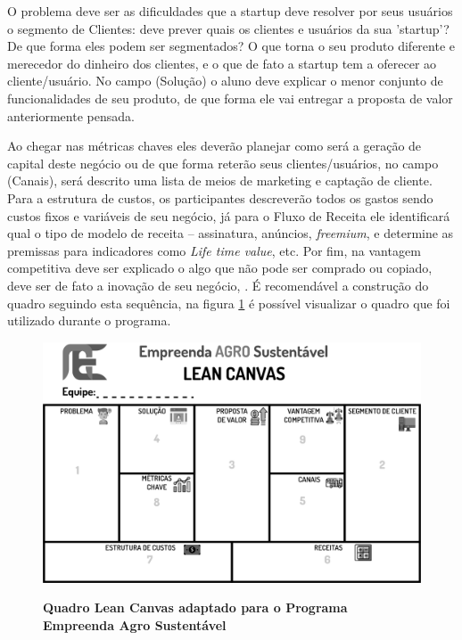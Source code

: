 O problema deve ser as dificuldades que a startup deve resolver por seus usuários o segmento de Clientes: deve prever quais os clientes e usuários da sua ’startup’? De que forma eles podem ser segmentados? O que torna o seu produto diferente e merecedor do dinheiro dos clientes, e o que de fato a startup tem a oferecer ao cliente/usuário. No campo (Solução) o aluno deve explicar o menor conjunto de funcionalidades de seu produto, de que forma ele vai entregar a proposta de valor anteriormente pensada. 

Ao chegar nas métricas chaves eles deverão planejar como será a geração de capital deste negócio ou de que forma reterão seus clientes/usuários, no campo (Canais), será descrito uma lista de meios de marketing e captação de cliente. Para a estrutura de custos, os participantes descreverão todos os gastos sendo custos fixos e variáveis de seu negócio, já para o Fluxo de Receita ele identificará qual o tipo de modelo de receita – assinatura, anúncios, \textit{freemium}, e determine as premissas para indicadores como \textit{Life time value}, etc. Por fim, na vantagem competitiva deve ser explicado o algo que não pode ser comprado ou copiado, deve ser de fato a inovação de seu negócio, \cite{maurya_running_2012, sebrae_aprenda_2019}. É recomendável a construção do quadro seguindo esta sequência, na figura \ref{figura_7} é possível visualizar o quadro que foi utilizado durante o programa. 



\begin{figure}[h!]
\centering
\caption{\textbf{Quadro Lean Canvas adaptado para o Programa Empreenda Agro Sustentável}}
\includegraphics[scale=0.2]{Imagens/canvas.png}
\label{figura_7}
\end{figure}
\newpage

